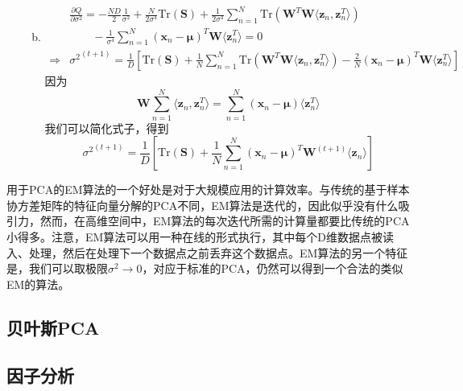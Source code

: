 \begin{enumerate}
\begin{enumerate}[(a)]
\begin{equation}
\begin{aligned}
			\end{aligned}
		\end{equation}
		\item 
		\begin{equation}
			\begin{aligned}
				&\frac{\partial Q}{\partial \sigma^2}=-\frac{ND}{2}\frac{1}{\sigma^2}+\frac{N}{2\sigma^4}\mathrm{Tr}(\boldsymbol{S})+\frac{1}{2\sigma^4}\sum_{n=1}^{N}\mathrm{Tr}(\boldsymbol{W}^T\boldsymbol{W}\langle \boldsymbol{z}_n,\boldsymbol{z}_n^T\rangle)\\
				&\qquad -\frac{1}{\sigma^4}\sum_{n=1}^{N}(\boldsymbol{x}_n-\boldsymbol{\mu})^T\boldsymbol{W}\langle \boldsymbol{z}_n^T\rangle=0\\
				\Rightarrow&{\sigma^2}^{(t+1)}=\frac{1}{D}\left[\mathrm{Tr}(\boldsymbol{S})+\frac{1}{N}\sum_{n=1}^{N}\mathrm{Tr}(\boldsymbol{W}^T\boldsymbol{W}\langle \boldsymbol{z}_n,\boldsymbol{z}_n^T\rangle)-\frac{2}{N}(\boldsymbol{x}_n-\boldsymbol{\mu})^T\boldsymbol{W}\langle \boldsymbol{z}_n^T\rangle \right]
			\end{aligned}
		\end{equation}
		因为
		\begin{equation}
			\boldsymbol{W}\sum_{n=1}^{N}\langle \boldsymbol{z}_n,\boldsymbol{z}_n^T\rangle =\sum_{n=1}^{N}(\boldsymbol{x}_n-\boldsymbol{\mu})\langle \boldsymbol{z}_n^T\rangle 
		\end{equation}
		我们可以简化式子，得到 
		\begin{equation}
			{\sigma^2}^{(t+1)}=\frac{1}{D}\left[\mathrm{Tr}(\boldsymbol{S})+\frac{1}{N}\sum_{n=1}^{N}(\boldsymbol{x}_n-\boldsymbol{\mu})^T\boldsymbol{W}^{(t+1)}\langle\boldsymbol{z}_n\rangle \right]
		\end{equation}
	\end{enumerate}
\end{enumerate}

用于PCA的EM算法的一个好处是对于大规模应用的计算效率。与传统的基于样本协方差矩阵的特征向量分解的PCA不同，EM算法是迭代的，因此似乎没有什么吸引力，然而，在高维空间中，EM算法的每次迭代所需的计算量都要比传统的PCA小得多。注意，EM算法可以用一种在线的形式执行，其中每个D维数据点被读入、处理，然后在处理下一个数据点之前丢弃这个数据点。EM算法的另一个特征是，我们可以取极限$\sigma^2\to 0$，对应于标准的PCA，仍然可以得到一个合法的类似EM的算法。

\subsection*{贝叶斯PCA}
\subsection*{因子分析}